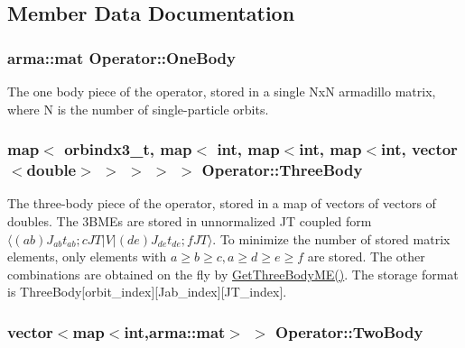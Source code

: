 \subsection{Member Data Documentation}
\hypertarget{classOperator_a14b1c78e0be45772aa57168c74d1b57c}{
\subsubsection[{One\-Body}]{\setlength{\rightskip}{0pt plus 5cm}arma\-::mat Operator\-::\-One\-Body}}\label{classOperator_a14b1c78e0be45772aa57168c74d1b57c}
The one body piece of the operator, stored in a single Nx\-N armadillo matrix, where N is the number of single-\/particle orbits. \hypertarget{classOperator_a2f3d3ccaa254194b81442fe01c39160d}{
\subsubsection[{Three\-Body}]{\setlength{\rightskip}{0pt plus 5cm}map$<$ orbindx3\-\_\-t, map$<$ int, map$<$int, map$<$int, vector$<$double$>$ $>$ $>$ $>$ $>$ Operator\-::\-Three\-Body}}\label{classOperator_a2f3d3ccaa254194b81442fe01c39160d}
The three-\/body piece of the operator, stored in a map of vectors of vectors of doubles. The 3\-B\-M\-Es are stored in unnormalized J\-T coupled form $ \langle (ab)J_{ab}t_{ab};cJT | V | (de)J_{de}t_{de};f JT \rangle $. To minimize the number of stored matrix elements, only elements with $ a\geq b \geq c, a\geq d\geq e \geq f $ are stored. The other combinations are obtained on the fly by \hyperlink{classOperator_ab2f0275c25ffb0f04935cb9d6ea043e1}{Get\-Three\-Body\-M\-E()}. The storage format is Three\-Body\mbox{[}orbit\-\_\-index\mbox{]}\mbox{[}Jab\-\_\-index\mbox{]}\mbox{[}J\-T\-\_\-index\mbox{]}. \hypertarget{classOperator_a0778ed6b9b7b47e34f11fa187189c943}{
\subsubsection[{Two\-Body}]{\setlength{\rightskip}{0pt plus 5cm}vector$<$map$<$int,arma\-::mat$>$ $>$ Operator\-::\-Two\-Body}}\label{classOperator_a0778ed6b9b7b47e34f11fa187189c943}
